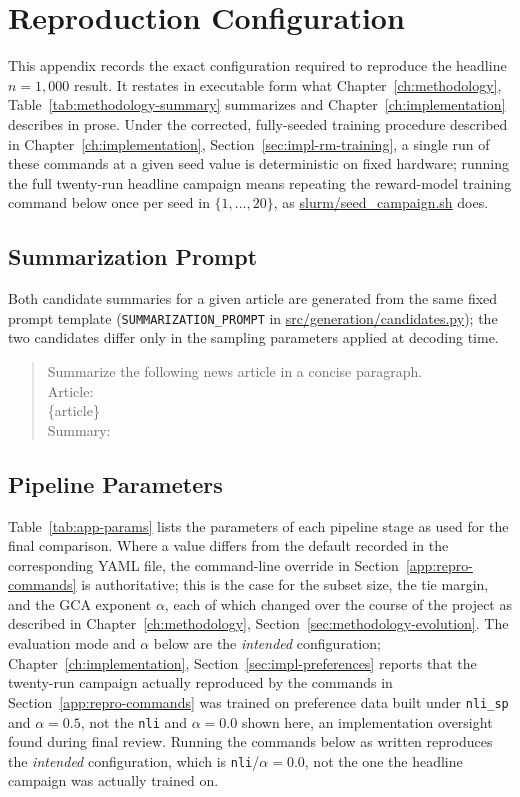\chapter{Reproduction Configuration}
\label{app:reproduction}

This appendix records the exact configuration required to reproduce the headline
$n=1{,}000$ result. It restates in executable form what
Chapter~\ref{ch:methodology}, Table~\ref{tab:methodology-summary} summarizes and
Chapter~\ref{ch:implementation} describes in prose. Under the corrected,
fully-seeded training procedure described in
Chapter~\ref{ch:implementation}, Section~\ref{sec:impl-rm-training}, a single
run of these commands at a given seed value is deterministic on fixed
hardware; running the full twenty-run headline campaign means repeating the
reward-model training command below once per seed in $\{1, \ldots, 20\}$, as
\url{slurm/seed_campaign.sh} does.

\section{Summarization Prompt}
\label{app:repro-prompt}

Both candidate summaries for a given article are generated from the same fixed
prompt template (\texttt{SUMMARIZATION\_PROMPT} in
\url{src/generation/candidates.py}); the two candidates differ only in the
sampling parameters applied at decoding time.

\begin{quote}
\small\ttfamily
Summarize the following news article in a concise paragraph.\\[2mm]
Article:\\
\{article\}\\[2mm]
Summary:
\end{quote}

\section{Pipeline Parameters}
\label{app:repro-params}

Table~\ref{tab:app-params} lists the parameters of each pipeline stage as used for
the final comparison. Where a value differs from the default recorded in the
corresponding YAML file, the command-line override in
Section~\ref{app:repro-commands} is authoritative; this is the case for the
subset size, the tie margin, and the GCA exponent $\alpha$, each of which changed
over the course of the project as described in Chapter~\ref{ch:methodology},
Section~\ref{sec:methodology-evolution}. The evaluation mode and $\alpha$
below are the \emph{intended} configuration; Chapter~\ref{ch:implementation},
Section~\ref{sec:impl-preferences} reports that the twenty-run campaign
actually reproduced by the commands in
Section~\ref{app:repro-commands} was trained on preference data built
under \texttt{nli\_sp} and $\alpha=0.5$, not the \texttt{nli} and
$\alpha=0.0$ shown here, an implementation oversight found during final
review. Running the commands below as written reproduces the
\emph{intended} configuration, which is \texttt{nli}/$\alpha=0.0$, not the
one the headline campaign was actually trained on.

